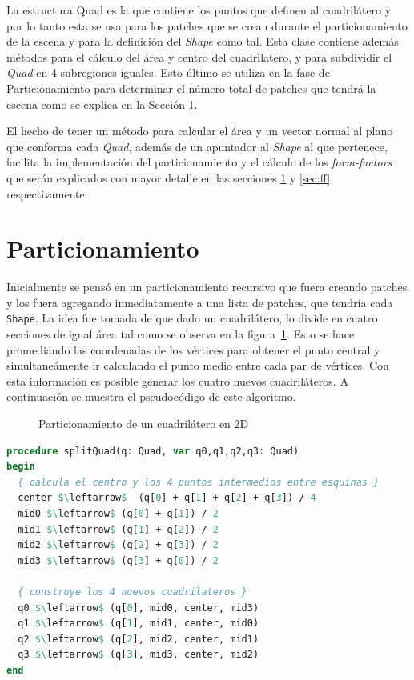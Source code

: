 \documentclass[letterpaper]{article}
\begin{document}

La estructura Quad es la que contiene los puntos que definen al
cuadrilátero y por lo tanto esta se usa para los patches que se crean
durante el particionamiento de la escena y para la definición del
\textsl{Shape} como tal. Esta clase contiene además métodos para el
cálculo del área y centro del cuadrilatero, y para subdividir el
\textsl{Quad} en 4 subregiones iguales. Esto último se utiliza en la
fase de Particionamiento para determinar el número total de patches
que tendrá la escena como se explica en la Sección \ref{sec:part}.

El hecho de tener un método para calcular el área y un vector normal
al plano que conforma cada {\em Quad}, además de un apuntador al
\textsl{Shape} al que pertenece, facilita la implementación del
particionamiento y el cálculo de los \textsl{form-factors} que serán
explicados con mayor detalle en las secciones \ref{sec:part} y
\ref{sec:ff} respectivamente.

\section{Particionamiento}
\label{sec:part}
Inicialmente se pensó en un particionamiento recursivo que fuera
creando patches y los fuera agregando inmediatamente a una lista de
patches, que tendría cada \texttt{Shape}. La idea fue tomada de
\cite{ggems3} que dado un cuadrilátero, lo divide en cuatro secciones
de igual área tal como se observa en la figura~\ref{fig:part}. Esto se
hace promediando las coordenadas de los vértices para obtener el punto
central y simultaneámente ir calculando el punto medio entre cada par
de vértices. Con esta información es posible generar los cuatro nuevos
cuadriláteros. A continuación se muestra el pseudocódigo de este
algoritmo.

\begin{figure}[htbp]
  \centering
  
  \caption{Particionamiento de un cuadrilátero en 2D}
  \label{fig:part}
\end{figure}

\begin{lstlisting}[language=pascal,caption=Algoritmo de subdivisión de un cuadrilátero,frame=single,mathescape=True]
procedure splitQuad(q: Quad, var q0,q1,q2,q3: Quad) 
begin
  { calcula el centro y los 4 puntos intermedios entre esquinas }
  center $\leftarrow$  (q[0] + q[1] + q[2] + q[3]) / 4
  mid0 $\leftarrow$ (q[0] + q[1]) / 2
  mid1 $\leftarrow$ (q[1] + q[2]) / 2
  mid2 $\leftarrow$ (q[2] + q[3]) / 2
  mid3 $\leftarrow$ (q[3] + q[0]) / 2

  { construye los 4 nuevos cuadrilateros }
  q0 $\leftarrow$ (q[0], mid0, center, mid3)
  q1 $\leftarrow$ (q[1], mid1, center, mid0)
  q2 $\leftarrow$ (q[2], mid2, center, mid1)
  q3 $\leftarrow$ (q[3], mid3, center, mid2)
end
\end{lstlisting}
\end{document}

